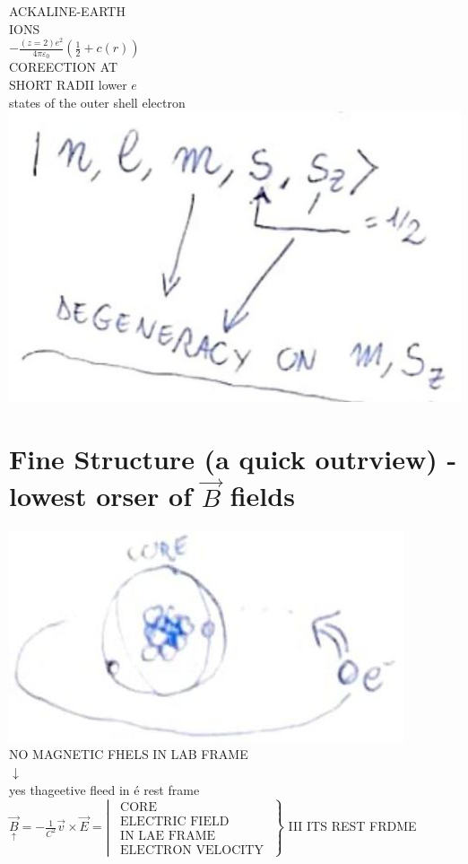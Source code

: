 \documentclass[10pt]{article}
\begin{document}
ACKALINE-EARTH\\
IONS\\
$-\frac{(z=2) e^{2}}{4 \pi \varepsilon_{0}}\left(\frac{1}{2}+c(r)\right)$\\
COREECTION AT\\
SHORT RADII lower $e$\\
states of the outer shell electron\\
\includegraphics[max width=\textwidth, center]{2025_10_16_e34e240cf6beac2f9e0dg-1}

\section*{Fine Structure (a quick outrview) - lowest orser of $\vec{B}$ fields}
\includegraphics[max width=\textwidth, center]{2025_10_16_e34e240cf6beac2f9e0dg-2(1)}\\
NO MAGNETIC FHELS IN LAB FRAME\\
$\downarrow$\\
yes thageetive fleed in é rest frame\\
$\left.\underset{\uparrow}{\vec{B}}=-\frac{1}{C^{2}} \vec{v} \times \vec{E}=\left\lvert\, \begin{array}{c}\text { CORE } \\ \text { ELECTRIC FIELD } \\ \text { IN LAE FRAME } \\ \text { ELECTRON VELOCITY }\end{array}\right.\right\}$ III ITS REST FRDME
\end{document}
